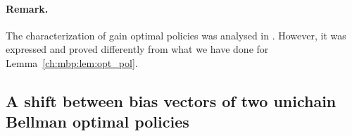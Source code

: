 \paragraph{Remark.} The characterization of gain optimal policies was analysed in \cite{puterman2014markov, schweitzer1978functional}.
However, it was expressed and proved differently from what we have done for Lemma~\ref{ch:mbp:lem:opt_pol}.

%
%
%

\subsection{A shift between bias vectors of two unichain Bellman optimal policies}

